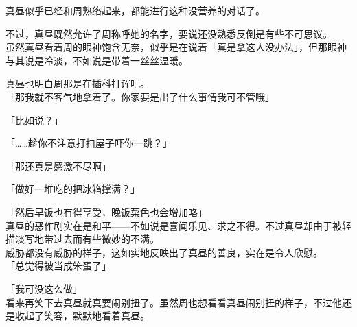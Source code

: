 真昼似乎已经和周熟络起来，都能进行这种没营养的对话了。

不过，真昼既然允许了周称呼她的名字，要说还没熟悉反倒是有些不可思议。\\

虽然真昼看着周的眼神饱含无奈，似乎是在说着「真是拿这人没办法」，但那眼神与其说是冷淡，不如说是带着一丝丝温暖。

真昼也明白周那是在插科打诨吧。\\

「那我就不客气地拿着了。你家要是出了什么事情我可不管哦」

「比如说？」

「……趁你不注意打扫屋子吓你一跳？」

「那还真是感激不尽啊」

「做好一堆吃的把冰箱撑满？」

「然后早饭也有得享受，晚饭菜色也会增加咯」\\

真昼的恶作剧实在是和平——不如说是喜闻乐见、求之不得。不过真昼却由于被轻描淡写地带过去而有些微妙的不满。\\

威胁都没有威胁的样子，这如实地反映出了真昼的善良，实在是令人欣慰。\\

「总觉得被当成笨蛋了」

「我可没这么做」\\

看来再笑下去真昼就真要闹别扭了。虽然周也想看看真昼闹别扭的样子，不过他还是收起了笑容，默默地看着真昼。
